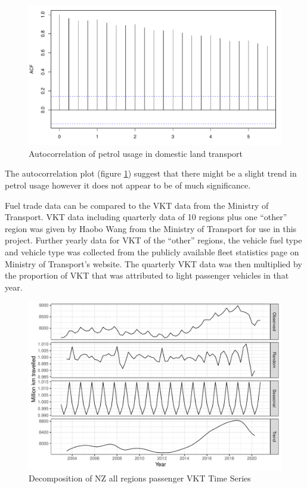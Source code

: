 \documentclass[
]{article}
\begin{document}
\begin{figure}
\centering
\includegraphics{final_report_files/figure-latex/acf_petrol-1.pdf}
\caption{Autocorrelation of petrol usage in domestic land
transport\label{fig:acf_petrol}}
\end{figure}

The autocorrelation plot (figure \ref{fig:acf_petrol}) suggest that
there might be a slight trend in petrol usage however it does not appear
to be of much significance.

Fuel trade data can be compared to the VKT data from the Ministry of
Transport. VKT data including quarterly data of 10 regions plus one
``other'' region was given by Haobo Wang from the Ministry of Transport
for use in this project. Further yearly data for VKT of the ``other''
regions, the vehicle fuel type and vehicle type was collected from the
publicly available fleet statistics page on Ministry of Transport's
website. The quarterly VKT data was then multiplied by the proportion of
VKT that was attributed to light passenger vehicles in that year.

\begin{figure}
\centering
\includegraphics{final_report_files/figure-latex/VKT_ts-1.pdf}
\caption{Decomposition of NZ all regions passenger VKT Time
Series\label{fig:VKT_ts}}
\end{figure}
\end{document}
